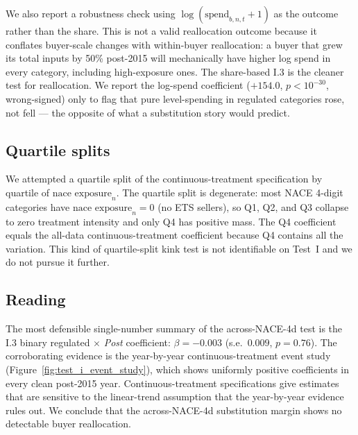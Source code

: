We also report a robustness check using $\log(\text{spend}_{b,n,t} + 1)$ as the outcome rather than the share. This is not a valid reallocation outcome because it conflates buyer-scale changes with within-buyer reallocation: a buyer that grew its total inputs by 50\% post-2015 will mechanically have higher log spend in every category, including high-exposure ones. The share-based I.3 is the cleaner test for reallocation. We report the log-spend coefficient ($+154.0$, $p < 10^{-30}$, wrong-signed) only to flag that pure level-spending in regulated categories rose, not fell --- the opposite of what a substitution story would predict.

\subsection{Quartile splits}

We attempted a quartile split of the continuous-treatment specification by quartile of $\text{nace exposure}_n$. The quartile split is degenerate: most NACE 4-digit categories have $\text{nace exposure}_n = 0$ (no ETS sellers), so Q1, Q2, and Q3 collapse to zero treatment intensity and only Q4 has positive mass. The Q4 coefficient equals the all-data continuous-treatment coefficient because Q4 contains all the variation. This kind of quartile-split kink test is not identifiable on Test~I and we do not pursue it further.

\subsection{Reading}

The most defensible single-number summary of the across-NACE-4d test is the I.3 binary regulated $\times$ \textit{Post} coefficient: $\beta = -0.003$ (s.e.\ $0.009$, $p = 0.76$). The corroborating evidence is the year-by-year continuous-treatment event study (Figure~\ref{fig:test_i_event_study}), which shows uniformly positive coefficients in every clean post-2015 year. Continuous-treatment specifications give estimates that are sensitive to the linear-trend assumption that the year-by-year evidence rules out. We conclude that the across-NACE-4d substitution margin shows no detectable buyer reallocation.
